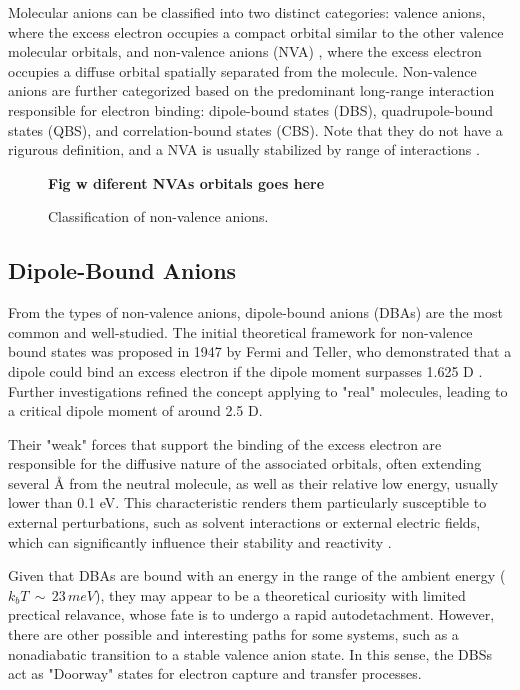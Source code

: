 Molecular anions can be classified into two distinct categories: valence anions, where the excess electron occupies a compact orbital similar to the other valence molecular orbitals, and non-valence anions (NVA) , where the excess electron occupies a diffuse orbital spatially separated from the molecule. Non-valence anions are further categorized based on the predominant long-range interaction responsible for electron binding: dipole-bound states (DBS), quadrupole-bound states (QBS), and correlation-bound states (CBS). Note that they do not have a rigurous definition, and a NVA is usually stabilized by range of interactions \cite{simons2008molecular,herbert2015quantum,abdoul1998electrons,simons2023molecular,jordan2003theory}.

\begin{figure}[h]
  \centering
  \textbf{Fig w diferent NVAs orbitals goes here}
  \caption[Classification of non-valence anions]{Classification of non-valence anions.}
  \label{fig:classification}
\end{figure}

\subsection{Dipole-Bound Anions}
From the types of non-valence anions, dipole-bound anions (DBAs) are the most common and well-studied. The initial theoretical framework for non-valence bound states was proposed in 1947 by Fermi and Teller, who demonstrated that a dipole could bind an excess electron if the dipole moment surpasses 1.625 D \cite{fermi1947capture}. Further investigations refined the concept applying to "real" molecules, leading to a critical dipole moment of around 2.5 D\cite{jordan2003theory}. 

Their "weak" forces that support the binding of the excess electron are responsible for the diffusive nature of the associated orbitals, often extending several \r{A} from the neutral molecule, as well as their relative low energy, usually lower than 0.1 eV. This characteristic renders them particularly susceptible to external perturbations, such as solvent interactions or external electric fields, which can significantly influence their stability and reactivity \cite{simons2008molecular,herbert2015quantum,jordan2003theory}.

Given that DBAs are bound with an energy in the range of the ambient energy ($k_bT\,\sim\,23\,meV$), they may appear to be a theoretical curiosity with limited prectical relavance, whose fate is to undergo a rapid autodetachment. However, there are other possible and interesting paths for some systems, such as a nonadiabatic transition to a stable valence anion state\cite{herbert2015quantum,jordan2003theory}. In this sense, the DBSs act as "Doorway" states for electron capture and transfer processes\cite{jordan2003theory,kang2024reaction}.

